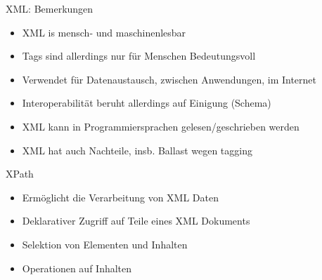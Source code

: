 \documentclass{beamer}
\begin{document}
\begin{frame}{XML: Bemerkungen}
	
	\begin{itemize}
		\item XML is mensch- und maschinenlesbar
		\item Tags sind allerdings nur für Menschen Bedeutungsvoll
		\item Verwendet für Datenaustausch, zwischen Anwendungen, im Internet
		\item Interoperabilität beruht allerdings auf Einigung (Schema)
		\item XML kann in Programmiersprachen gelesen/geschrieben werden
		\item XML hat auch Nachteile, insb. Ballast wegen tagging
	\end{itemize}
	
\end{frame}

\begin{frame}{XPath}
	
	\begin{itemize}
		\item Ermöglicht die Verarbeitung von XML Daten
		\item Deklarativer Zugriff auf Teile eines XML Dokuments
		\item Selektion von Elementen und Inhalten
		\item Operationen auf Inhalten
	\end{itemize}
	
\end{frame}
\end{document}
